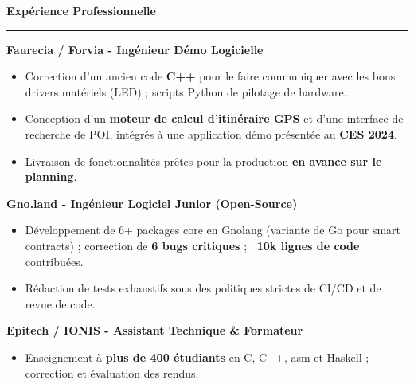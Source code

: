 \documentclass[9pt]{extarticle}
\begin{document}
\par\vspace{5pt}

{\large\bfseries Expérience Professionnelle}
\par\vspace{-8pt}
\rule{\linewidth}{0.4pt}
\par\vspace{5pt}

{\bfseries Faurecia / Forvia - Ingénieur Démo Logicielle}
\begin{itemize}[noitemsep, topsep=0pt]
	\item Correction d'un ancien code {\bfseries C++} pour le faire communiquer avec les bons drivers matériels (LED) ; scripts Python de pilotage de hardware.
	\item Conception d'un {\bfseries moteur de calcul d'itinéraire GPS} et d'une interface de recherche de POI, intégrés à une application démo présentée au {\bfseries CES 2024}.
	\item Livraison de fonctionnalités prêtes pour la production {\bfseries en avance sur le planning}.
\end{itemize}

\par\vspace{5pt}

{\bfseries Gno.land - Ingénieur Logiciel Junior (Open-Source)}
\begin{itemize}[noitemsep, topsep=0pt]
	\item Développement de 6+ packages core en Gnolang (variante de Go pour smart contracts) ; correction de {\bfseries 6 bugs critiques} ; {\bfseries ~10k lignes de code} contribuées.
	\item Rédaction de tests exhaustifs sous des politiques strictes de CI/CD et de revue de code.
\end{itemize}

\par\vspace{5pt}

{\bfseries Epitech / IONIS - Assistant Technique \& Formateur}
\begin{itemize}[noitemsep, topsep=0pt]
	\item Enseignement à {\bfseries plus de 400 étudiants} en C, C++, asm et Haskell ; correction et évaluation des rendus.
\end{itemize}

\par\vspace{5pt}
\end{document}
